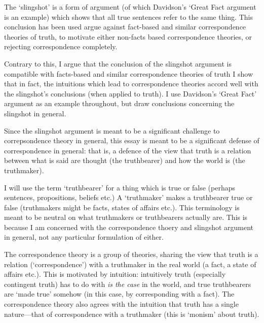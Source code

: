 



The `slingshot' is a form of argument (of which Davidson's `Great Fact argument is an example) which shows that all true sentences refer to the same thing.
This conclusion has been used argue against fact-based and similar correspondence theories of truth, to motivate either non-facts based correspondence theories, or rejecting correspondence completely.

Contrary to this, I argue that the conclusion of the slingshot argument is compatible with facts-based and similar correspondence theories of truth
I show that in fact, the intuitions which lead to correspondence theories accord well with the slingshot's conclusions (when applied to truth).
I use Davidson's `Great Fact' argument as an example throughout, but draw conclusions concerning the slingshot in general.

Since the slingshot argument is meant to be a significant challenge to correpsondence theory in general, this essay is meant to be a significant defense of correspondence in general: that is, a defence of the view that truth is a relation between what is said are thought (the truthbearer) and how the world is (the truthmaker).

I will use the term `truthbearer' for a thing which is true or false (perhaps sentences, propositions, beliefs etc.)
A `truthmaker' makes a truthbearer true or false (truthmakers might be facts, states of affairs etc.).
This terminology is meant to be neutral on what truthmakers or truthbearers actually are.
This is because I am concerned with the correspondence thoery and slingshot argument in general, not any particular formulation of either.

The correspondence theory is a group of theories, sharing the view that truth is a relation (`correspondence') with a truthmaker in the real world (a fact, a state of affairs etc.).
This is motivated by intuition: intuitively truth  (especially contingent truth) has to do with \emph{is the case} in the world, and true truthbearers are `made true' somehow (in this case, by corresponding with a fact).
The correspondence theory also agrees with the intuition that truth has a single nature---that of correspondence with a truthmaker (this is `monism' about truth).

